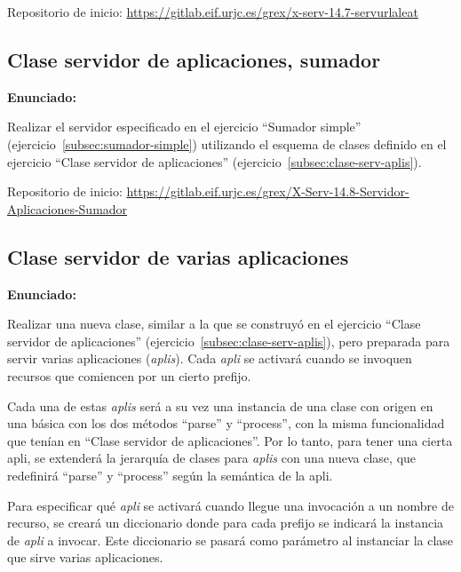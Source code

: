 Repositorio de inicio: \url{https://gitlab.eif.urjc.es/grex/x-serv-14.7-servurlaleat}

\subsection{Clase servidor de aplicaciones, sumador}
\label{subsec:clase-sumador-simple}

\textbf{Enunciado:}

Realizar el servidor especificado en el ejercicio ``Sumador simple'' (ejercicio~\ref{subsec:sumador-simple}) utilizando el esquema de clases definido en el ejercicio ``Clase servidor de aplicaciones'' (ejercicio~\ref{subsec:clase-serv-aplis}).

Repositorio de inicio: \url{https://gitlab.eif.urjc.es/grex/X-Serv-14.8-Servidor-Aplicaciones-Sumador}

\subsection{Clase servidor de varias aplicaciones}
\label{subsec:clase-serv-aplis-multi}

\textbf{Enunciado:}

Realizar una nueva clase, similar a la que se construyó en el ejercicio ``Clase servidor de aplicaciones'' (ejercicio~\ref{subsec:clase-serv-aplis}), pero preparada para servir varias aplicaciones (\emph{aplis}). Cada \emph{apli} se activará cuando se invoquen recursos que comiencen por un cierto prefijo.

Cada una de estas \emph{aplis} será a su vez una instancia de una clase con origen en una básica con los dos métodos ``parse'' y ``process'', con la misma funcionalidad que tenían en ``Clase servidor de aplicaciones''. Por lo tanto, para tener una cierta apli, se extenderá la jerarquía de clases para \emph{aplis} con una nueva clase, que redefinirá ``parse'' y ``process'' según la semántica de la apli.

Para especificar qué \emph{apli} se activará cuando llegue una invocación a un nombre de recurso, se creará un diccionario donde para cada prefijo se indicará la instancia de \emph{apli} a invocar. Este diccionario se pasará como parámetro al instanciar la clase que sirve varias aplicaciones.

